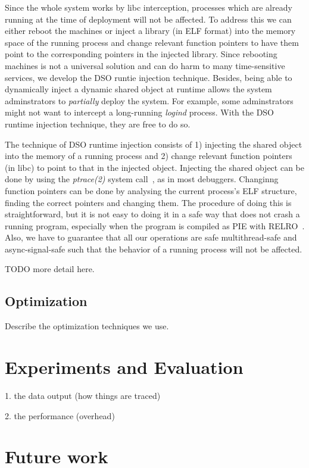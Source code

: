 \documentclass[letterpaper,twocolumn,10pt]{article}
\begin{document}
Since the whole system works by libc interception, processes which are already
running at the time of deployment will not be affected. To address this we can
either reboot the machines or inject a library (in ELF format) into the memory
space of the running process and change relevant function pointers to have
them point to the corresponding pointers in the injected library. Since
rebooting machines is not a universal solution and can do harm to many
time-sensitive services, we develop the DSO runtie injection technique.
Besides, being able to dynamically inject a dynamic shared object at runtime
allows the system adminstrators to \textit{partially} deploy the system. For
example, some adminstrators might not want to intercept a long-running
\textit{logind} process. With the DSO runtime injection technique, they are
free to do so.

The technique of DSO runtime injection consists of 1) injecting the shared
object into the memory of a running process and 2) change relevant function
pointers (in libc) to point to that in the injected object. Injecting the
shared object can be done by using the \textit{ptrace(2)} system
call~\cite{ptrace:2017}, as in most debuggers. Changinng function pointers can
be done by analysing the current process's ELF structure, finding the correct
pointers and changing them. The procedure of doing this is straightforward,
but it is not easy to doing it in a safe way that does not crash a running
program, especially when the program is compiled as PIE with
RELRO~\cite{something}. Also, we have to guarantee that all our operations are
safe multithread-safe and async-signal-safe such that the behavior of a
running process will not be affected.

TODO more detail here.

\subsection{Optimization} \label{sec:optm}

Describe the optimization techniques we use.

\section{Experiments and Evaluation}

1. the data output (how things are traced)

2. the performance (overhead)

\section{Future work}
\end{document}
